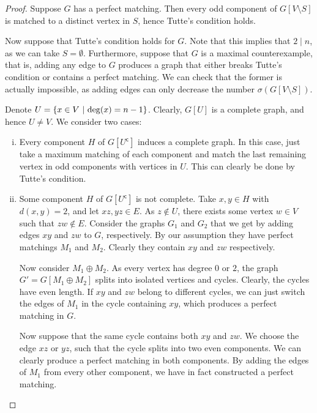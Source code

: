 \begin{proof}
Suppose $G$ has a perfect matching. Then every odd component of
$G[V \setminus S]$ is matched to a distinct vertex in $S$, hence
Tutte's condition holds.

Now suppose that Tutte's condition holds for $G$. Note that this
implies that $2 \mid n$, as we can take $S = \emptyset$.
Furthermore, suppose that $G$ is a maximal counterexample, that is,
adding any edge to $G$ produces a graph that either breaks Tutte's
condition or contains a perfect matching. We can check that the
former is actually impossible, as adding edges can only decrease
the number $\sigma(G[V \setminus S])$.

Denote $U = \left\{x \in V~\middle\vert~\deg(x) = n-1\right\}$. Clearly, $G[U]$ is a
complete graph, and hence $U \ne V$. We consider two cases:

\begin{enumerate}[i)]
\item Every component $H$ of $G[U^{\mathsf{c}}]$ induces a complete
graph. In this case, just take a maximum matching of each component
and match the last remaining vertex in odd components with vertices
in $U$. This can clearly be done by Tutte's condition.

\item Some component $H$ of $G[U^{\mathsf{c}}]$ is not complete.
Take $x, y \in H$ with $d(x,y) = 2$, and let $xz, yz \in E$. As
$z \not \in U$, there exists some vertex $w \in V$ such that
$zw \not \in E$. Consider the graphs $G_1$ and $G_2$ that we get by
adding edges $xy$ and $zw$ to $G$, respectively. By our assumption
they have perfect matchings $M_1$ and $M_2$. Clearly they contain
$xy$ and $zw$ respectively.

Now consider $M_1 \oplus M_2$. As every vertex has degree $0$ or
$2$, the graph $G' = G[M_1 \oplus M_2]$ splits into isolated
vertices and cycles. Clearly, the cycles have even length. If $xy$
and $zw$ belong to different cycles, we can just switch the edges
of $M_1$ in the cycle containing $xy$, which produces a perfect
matching in $G$.

Now suppose that the same cycle contains both $xy$ and $zw$. We
choose the edge $xz$ or $yz$, such that the cycle splits into two
even components. We can clearly produce a perfect matching in both
components. By adding the edges of $M_1$ from every other
component, we have in fact constructed a perfect matching. \qedhere
\end{enumerate}
\end{proof}

